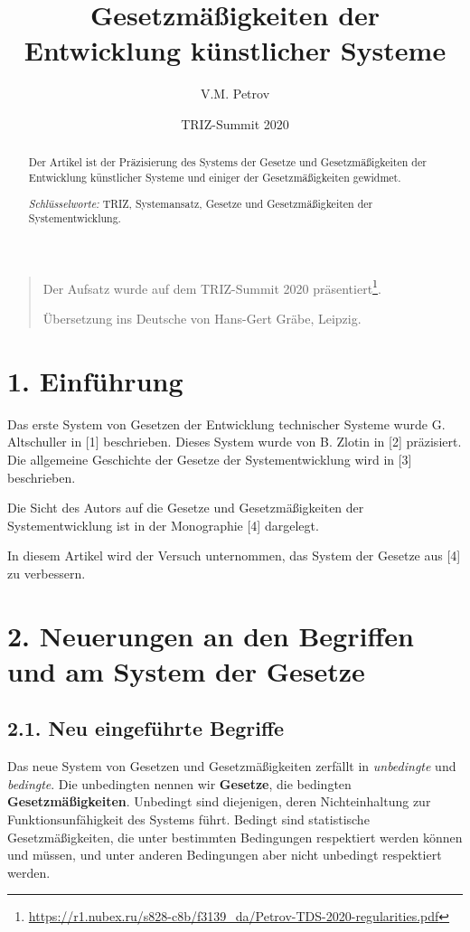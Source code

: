 \documentclass[11pt,a4paper]{article}
\title{Gesetzmäßigkeiten der Entwicklung künstlicher Systeme}
\author{V.M. Petrov}
\date{TRIZ-Summit 2020}
\begin{document}
\maketitle

\begin{quote}
  Der Aufsatz wurde auf dem TRIZ-Summit 2020
  präsentiert\footnote{\url{https://r1.nubex.ru/s828-c8b/f3139_da/Petrov-TDS-2020-regularities.pdf}}.  

  Übersetzung ins Deutsche von Hans-Gert Gräbe, Leipzig.
\end{quote}

\begin{abstract}
  Der Artikel ist der Präzisierung des Systems der Gesetze und
  Gesetzmäßigkeiten der Entwicklung künstlicher Systeme und einiger
  der Gesetzmäßigkeiten gewidmet.

  \emph{Schlüsselworte:} TRIZ, Systemansatz, Gesetze und Gesetzmäßigkeiten
  der Systementwicklung.
\end{abstract}

\section{1. Einführung}
Das erste System von Gesetzen der Entwicklung technischer Systeme wurde
G. Altschuller in [1] beschrieben. Dieses System wurde von B. Zlotin in [2]
präzisiert.  Die allgemeine Geschichte der Gesetze der Systementwicklung wird
in [3] beschrieben.

Die Sicht des Autors auf die Gesetze und Gesetzmäßigkeiten der
Systementwicklung ist in der Monographie [4] dargelegt.

In diesem Artikel wird der Versuch unternommen, das System der Gesetze aus [4]
zu verbessern.

\section{2. Neuerungen an den Begriffen und am System der Gesetze}

\subsection{2.1. Neu eingeführte Begriffe}

Das neue System von Gesetzen und Gesetzmäßigkeiten zerfällt in
\emph{unbedingte} und \emph{bedingte}. Die unbedingten nennen wir
\textbf{Gesetze}, die bedingten \textbf{Gesetzmäßigkeiten}.  Unbedingt sind
diejenigen, deren Nichteinhaltung zur Funktionsunfähigkeit des Systems führt.
Bedingt sind statistische Gesetzmäßigkeiten, die unter bestimmten Bedingungen
respektiert werden können und müssen, und unter anderen Bedingungen aber nicht
unbedingt respektiert werden.
\end{document}
